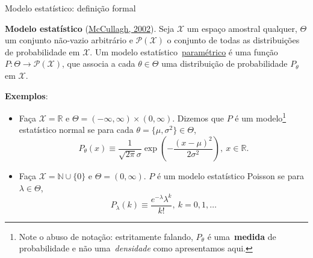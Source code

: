 \begin{frame}{Modelo estatístico: definição formal}
\begin{defn}
 \textbf{Modelo estatístico} (\href{https://projecteuclid.org/download/pdf_1/euclid.aos/1035844977}{McCullagh, 2002}).
 Seja $\mathcal{X}$ um espaço amostral qualquer, $\Theta$ um conjunto não-vazio arbitrário e $\mathcal{P}(\mathcal{X})$ o conjunto de todas as distribuições de probabilidade em $\mathcal{X}$.
 Um modelo estatístico~\underline{paramétrico} é uma função $P : \Theta \to \mathcal{P}(\mathcal{X})$, que associa a cada $\theta \in \Theta$ uma distribuição de probabilidade $P_\theta$ em $\mathcal{X}$.
\end{defn}
\textbf{Exemplos}:
\begin{itemize}
 \item Faça $\mathcal{X} = \mathbb{R}$ e $\Theta = (-\infty, \infty)\times (0, \infty)$.
 Dizemos que $P$ é um modelo\footnote{Note o abuso de notação: estritamente falando, $P_\theta$  é uma~\textbf{medida} de probabilidade e não uma~\textit{densidade} como apresentamos aqui.} estatístico normal se para cada $\theta = \{\mu, \sigma^2\} \in \Theta$,
 $$P_{\theta}(x) \equiv \frac{1}{\sqrt{2\pi}\sigma}\exp\left(-\frac{(x-\mu)^2}{2\sigma^2}\right), \: x \in \mathbb{R}.$$
 \item Faça $\mathcal{X} = \mathbb{N}\cup \{0\}$ e $\Theta = (0, \infty)$.
 $P$ é um modelo estatístico Poisson se para $\lambda \in \Theta$,
 $$P_{\lambda}(k) \equiv \frac{e^{-\lambda}\lambda^k}{k!}, \: k = 0, 1, \ldots$$
\end{itemize} 
\end{frame}

